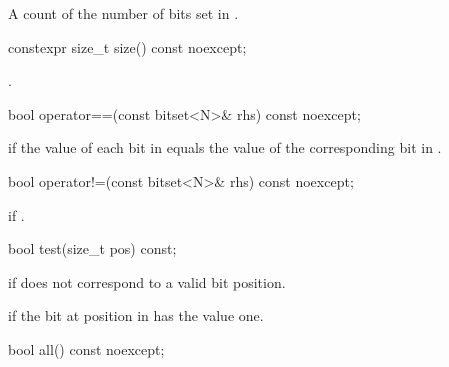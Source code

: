 \begin{itemdescr}
\pnum
\returns
A count of the number of bits set in
.
\end{itemdescr}

%
\begin{itemdecl}
constexpr size_t size() const noexcept;
\end{itemdecl}

\begin{itemdescr}
\pnum
\returns
{}.
\end{itemdescr}

%
\begin{itemdecl}
bool operator==(const bitset<N>& rhs) const noexcept;
\end{itemdecl}

\begin{itemdescr}
\pnum
\returns
{} if the value of each bit in
equals the value of the corresponding bit in .
\end{itemdescr}

%
\begin{itemdecl}
bool operator!=(const bitset<N>& rhs) const noexcept;
\end{itemdecl}

\begin{itemdescr}
\pnum
\returns
{} if
.
\end{itemdescr}

%
\begin{itemdecl}
bool test(size_t pos) const;
\end{itemdecl}

\begin{itemdescr}
\pnum
\throws
{}
if  does not correspond to a valid bit position.%

\pnum
\returns
{}
if the bit at position 
in
has the value one.
\end{itemdescr}

%
\begin{itemdecl}
bool all() const noexcept;
\end{itemdecl}

\begin{itemdescr}
\pnum
\returns {}
\end{itemdescr}

